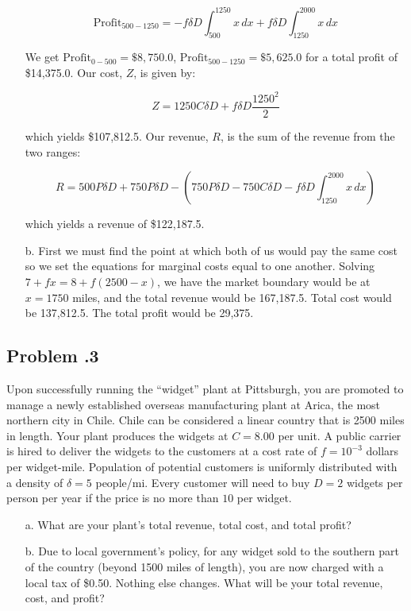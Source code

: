 \documentclass[12pt]{article}
\newcommand{\customsubsection}[1]{
  \subsection*{Problem \thesection.#1}
}
\begin{document}
\begin{itemize}
\[
\text{Profit}_{500-1250} = -f\delta D \int_{500}^{1250} x \, dx + f\delta D \int_{1250}^{2000} x \, dx
\]

We get \(\text{Profit}_{0-500} = \$8,750.0\), \(\text{Profit}_{500-1250} = \$5,625.0\) for a total profit of \$14,375.0. Our cost, \(Z\), is given by:

\[
Z = 1250C \delta D + f\delta D \frac{1250^2}{2}
\]

which yields \$107,812.5. Our revenue, \(R\), is the sum of the revenue from the two ranges:

\[
R = 500P\delta D + 750P\delta D - \left( 750P\delta D - 750C\delta D - f\delta D \int_{1250}^{2000} x \, dx \right) 
\]

which yields a revenue of \$122,187.5.


    \item [b.] First we must find the point at which both of us would pay the same cost so we set the equations for marginal costs equal to one another. Solving $7 + f x = 8 + f (2500-x)$, we have the market boundary would be at $x=1750$ miles, and the total revenue would be 167,187.5. Total cost would be 137,812.5. The total profit would be 29,375.
\end{itemize}

\newpage

\customsubsection{3}
Upon successfully running the “widget” plant at Pittsburgh, you are promoted to manage a newly established overseas manufacturing plant at Arica, the most northern city in Chile. Chile can be considered a linear country that is 2500 miles in length. Your plant produces the widgets at $C = 8.00$ per unit. A public carrier is hired to deliver the widgets to the customers at a cost rate of $f = 10^{-3}$ dollars per widget-mile. Population of potential customers is uniformly distributed with a density of $\delta = 5$ people/mi. Every customer will need to buy $D = 2$ widgets per person per year if the price is no more than $10$ per widget.

\begin{itemize}
    \item [a.] What are your plant’s total revenue, total cost, and total profit?
    \item [b.] Due to local government’s policy, for any widget sold to the southern part of the country (beyond 1500 miles of length), you are now charged with a local tax of \$0.50. Nothing else changes. What will be your total revenue, cost, and profit?

\end{itemize}
\end{document}
